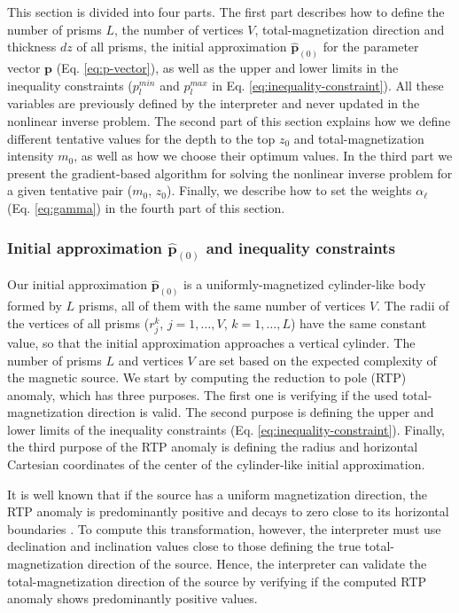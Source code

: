 This section is divided into four parts. The first part describes how to define  
the number of prisms $L$, the number of vertices $V$, total-magnetization 
direction and thickness $dz$ of all prisms, the initial approximation
$\hat{\mathbf{p}}_{(0)}$ for the parameter vector $ \mathbf{p} $ 
(Eq. \ref{eq:p-vector}), as well as the upper and lower limits in the inequality
constraints ($p_{l}^{min}$ and $p_{l}^{max}$ in Eq. \ref{eq:inequality-constraint}). 
All these variables are previously defined by the interpreter and never updated
in the nonlinear inverse problem.
The second part of this section explains how we define different 
tentative values for the depth to the top $z_{0}$ and total-magnetization
intensity $m_{0}$, as well as how we choose their optimum values.
In the third part we present the gradient-based algorithm for solving the nonlinear
inverse problem for a given tentative pair ($m_{0}$, $z_{0}$). 
Finally, we describe how to set the weights $ \alpha_{\ell} $ 
(Eq. \ref{eq:gamma}) in the fourth part of this section.

\subsubsection{Initial approximation $\hat{\mathbf{p}}_{(0)}$ and inequality constraints}

Our initial approximation $\hat{\mathbf{p}}_{(0)}$ is a uniformly-magnetized
cylinder-like body formed by 
$L$ prisms, all of them with the same number of vertices $V$. The radii of the
vertices of all prisms ($r^{k}_{j}$, $j=1,\dots , V$, $k=1,\dots ,L$) have the 
same constant value, so that the initial approximation approaches a vertical
cylinder. 
The number of prisms $L$ and vertices $V$ are set based on the expected complexity 
of the magnetic source.
We start by computing the reduction to pole (RTP) anomaly, which has three purposes.
The first one is verifying if the used total-magnetization direction is valid.
The second purpose is defining the upper and lower limits of the inequality
constraints (Eq. \ref{eq:inequality-constraint}).
Finally, the third purpose of the RTP anomaly is defining the radius and horizontal
Cartesian coordinates of the center of the cylinder-like initial approximation.

It is well known that if the source has a uniform magnetization direction, 
the RTP anomaly is predominantly positive and decays to zero close to its 
horizontal boundaries \cite[e.g.,][p. 331]{blakely1996}. 
To compute this transformation, however, the interpreter must use declination and
inclination values close to those defining the true total-magnetization direction
of the source. 
Hence, the interpreter can validate the total-magnetization direction of the source 
by verifying if the computed RTP anomaly shows predominantly positive values.

